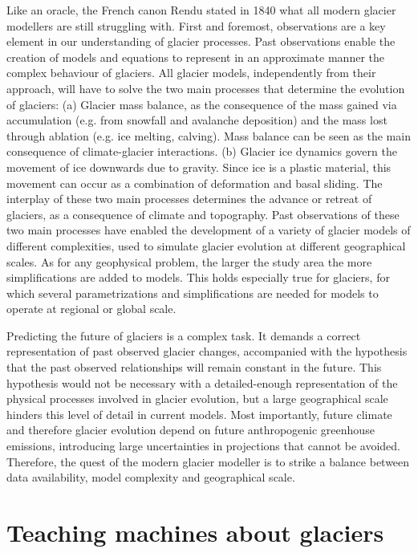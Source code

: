 Like an oracle, the French canon Rendu stated in 1840 what all modern glacier modellers are still struggling with. First and foremost, observations are a key element in our understanding of glacier processes. Past observations enable the creation of models and equations to represent in an approximate manner the complex behaviour of glaciers. All glacier models, independently from their approach, will have to solve the two main processes that determine the evolution of glaciers: (a) Glacier mass balance, as the consequence of the mass gained via accumulation (e.g. from snowfall and avalanche deposition) and the mass lost through ablation (e.g. ice melting, calving). Mass balance can be seen as the main consequence of climate-glacier interactions. (b) Glacier ice dynamics govern the movement of ice downwards due to gravity. Since ice is a plastic material, this movement can occur as a combination of deformation and basal sliding. The interplay of these two main processes determines the advance or retreat of glaciers, as a consequence of climate and topography. Past observations of these two main processes have enabled the development of a variety of glacier models of different complexities, used to simulate glacier evolution at different geographical scales. As for any geophysical problem, the larger the study area the more simplifications are added to models. This holds especially true for glaciers, for which several parametrizations and simplifications are needed for models to operate at regional or global scale. 

Predicting the future of glaciers is a complex task. It demands a correct representation of past observed glacier changes, accompanied with the hypothesis that the past observed relationships will remain constant in the future. This hypothesis would not be necessary with a detailed-enough representation of the physical processes involved in glacier evolution, but a large geographical scale hinders this level of detail in current models. Most importantly, future climate and therefore glacier evolution depend on future anthropogenic greenhouse emissions, introducing large uncertainties in projections that cannot be avoided. Therefore, the quest of the modern glacier modeller is to strike a balance between data availability, model complexity and geographical scale.

\section{Teaching machines about glaciers}

